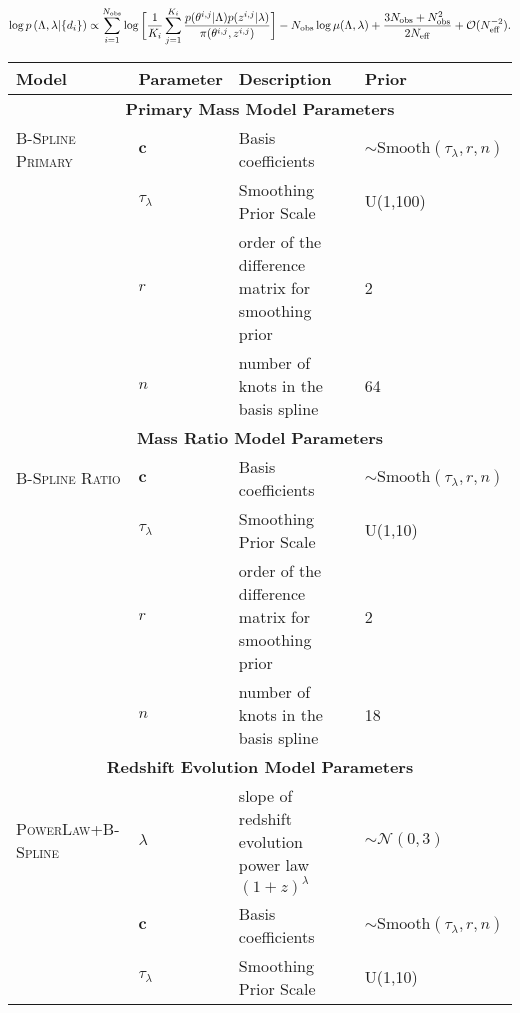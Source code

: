 \begin{equation}\label{importance-posterior}
    \log p\left(\Lambda, \lambda | \{d_i\}\right) \propto \sum_{i=1}^{N_\mathrm{obs}} \log \bigg[ \frac{1}{K_i} \sum_{j=1}^{K_i} \frac{p(\theta^{i,j}|\Lambda)p(z^{i,j}|\lambda)}{\pi(\theta^{i,j}, z^{i,j})} \bigg] -  \\
    N_\mathrm{obs} \log \mu(\Lambda, \lambda) + \frac{3N_\mathrm{obs} + N_\mathrm{obs}^2}{2N_\mathrm{eff}} + \mathcal{O}(N_\mathrm{eff}^{-2}).
\end{equation}


\begin{table*}[hb!]
    \centering
    \begin{tabular}{|l|l|l|l|}
    \hline
    \textbf{Model} & \textbf{Parameter} & \textbf{Description} & \textbf{Prior} \\ \hline \hline
    \multicolumn{4}{|c|}{\textbf{Primary Mass Model Parameters}} \\ \hline
    \textsc{B-Spline Primary} & $\bm{c}$ & Basis coefficients & $\sim \mathrm{Smooth}(\tau_\lambda, r, n)$ \\ \cline{2-4} 
     & $\tau_\lambda$ & Smoothing Prior Scale & U(1,100) \\ \cline{2-4}
     & $r$ & order of the difference matrix for smoothing prior & 2 \\ \cline{2-4} 
     & $n$ & number of knots in the basis spline & 64 \\ \hline \hline 
    \multicolumn{4}{|c|}{\textbf{Mass Ratio Model Parameters}} \\ \hline
    \textsc{B-Spline Ratio} & $\bm{c}$ & Basis coefficients & $\sim \mathrm{Smooth}(\tau_\lambda, r, n)$ \\ \cline{2-4} 
     & $\tau_\lambda$ & Smoothing Prior Scale & U(1,10) \\ \cline{2-4}
     & $r$ & order of the difference matrix for smoothing prior & 2 \\ \cline{2-4} 
     & $n$ & number of knots in the basis spline & 18 \\ \hline \hline
    \multicolumn{4}{|c|}{\textbf{Redshift Evolution Model Parameters}} \\ \hline
    \textsc{PowerLaw+B-Spline} & $\lambda$ & slope of redshift evolution power law $(1+z)^\lambda$ &  $\sim \mathcal{N}(0,3)$ \\ \cline{2-4}
    & $\bm{c}$ & Basis coefficients & $\sim \mathrm{Smooth}(\tau_\lambda, r, n)$ \\ \cline{2-4} 
     & $\tau_\lambda$ & Smoothing Prior Scale & U(1,10) \\ \cline{2-4}

\end{tabular}
\end{table*}

